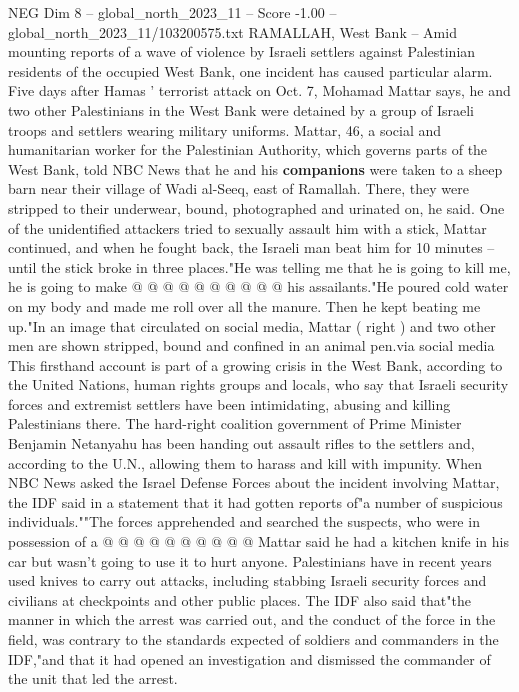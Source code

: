\begin{textsample}{NEG Dim 8 – global\_north\_2023\_11 – Score -1.00 – global\_north\_2023\_11/103200575.txt}  \label{ex:f8_neg_332}
RAMALLAH, West Bank -- Amid mounting reports of a wave of violence by Israeli settlers against Palestinian residents of the occupied West Bank, one incident has caused particular alarm.
Five days after Hamas ' terrorist attack on Oct. 7, Mohamad Mattar says, he and two other Palestinians in the West Bank were detained by a group of Israeli troops and settlers wearing military uniforms.
Mattar, 46, a social and humanitarian worker for the Palestinian Authority, which governs parts of the West Bank, told NBC News that he and his \textbf{companions} were taken to a sheep barn near their village of Wadi al-Seeq, east of Ramallah.
There, they were stripped to their underwear, bound, photographed and urinated on, he said.
One of the unidentified attackers tried to sexually assault him with a stick, Mattar continued, and when he fought back, the Israeli man beat him for 10 minutes -- until the stick broke in three places."He was telling me that he is going to kill me, he is going to make @ @ @ @ @ @ @ @ @ @ his assailants."He poured cold water on my body and made me roll over all the manure.
Then he kept beating me up."In an image that circulated on social media, Mattar ( right ) and two other men are shown stripped, bound and confined in an animal pen.via social media This firsthand account is part of a growing crisis in the West Bank, according to the United Nations, human rights groups and locals, who say that Israeli security forces and extremist settlers have been intimidating, abusing and killing Palestinians there.
The hard-right coalition government of Prime Minister Benjamin Netanyahu has been handing out assault rifles to the settlers and, according to the U.N., allowing them to harass and kill with impunity.
When NBC News asked the Israel Defense Forces about the incident involving Mattar, the IDF said in a statement that it had gotten reports of"a number of suspicious individuals.""The forces apprehended and searched the suspects, who were in possession of a @ @ @ @ @ @ @ @ @ @ Mattar said he had a kitchen knife in his car but wasn't going to use it to hurt anyone.
Palestinians have in recent years used knives to carry out attacks, including stabbing Israeli security forces and civilians at checkpoints and other public places.
The IDF also said that"the manner in which the arrest was carried out, and the conduct of the force in the field, was contrary to the standards expected of soldiers and commanders in the IDF,"and that it had opened an investigation and dismissed the commander of the unit that led the arrest.

\end{textsample}
